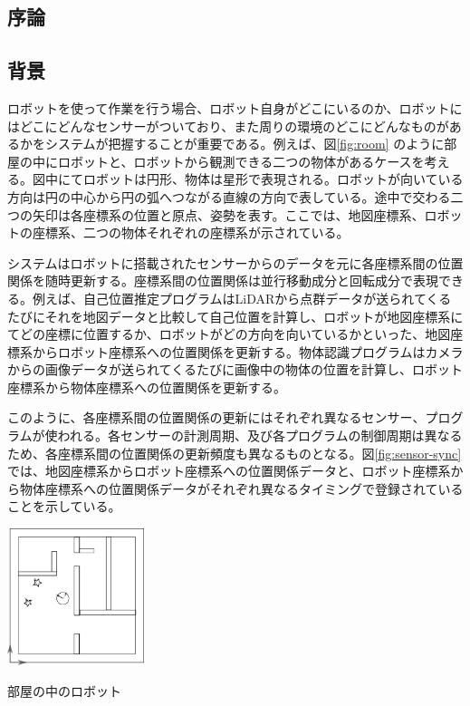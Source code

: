 \documentclass{jarticle}
\begin{document}
\begin{multicols}{2}

\section{序論}
\subsection{背景}
ロボットを使って作業を行う場合、ロボット自身がどこにいるのか、ロボットにはどこにどんなセンサーがついており、また周りの環境のどこにどんなものがあるかをシステムが把握することが重要である。例えば、図\ref{fig:room} のように部屋の中にロボットと、ロボットから観測できる二つの物体があるケースを考える。図中にてロボットは円形、物体は星形で表現される。ロボットが向いている方向は円の中心から円の弧へつながる直線の方向で表している。途中で交わる二つの矢印は各座標系の位置と原点、姿勢を表す。ここでは、地図座標系、ロボットの座標系、二つの物体それぞれの座標系が示されている。

システムはロボットに搭載されたセンサーからのデータを元に各座標系間の位置関係を随時更新する。座標系間の位置関係は並行移動成分と回転成分で表現できる。例えば、自己位置推定プログラムはLiDARから点群データが送られてくるたびにそれを地図データと比較して自己位置を計算し、ロボットが地図座標系にてどの座標に位置するか、ロボットがどの方向を向いているかといった、地図座標系からロボット座標系への位置関係を更新する。物体認識プログラムはカメラからの画像データが送られてくるたびに画像中の物体の位置を計算し、ロボット座標系から物体座標系への位置関係を更新する。

このように、各座標系間の位置関係の更新にはそれぞれ異なるセンサー、プログラムが使われる。各センサーの計測周期、及び各プログラムの制御周期は異なるため、各座標系間の位置関係の更新頻度も異なるものとなる。図\ref{fig:sensor-sync}では、地図座標系からロボット座標系への位置関係データと、ロボット座標系から物体座標系への位置関係データがそれぞれ異なるタイミングで登録されていることを示している。


\begin{figurehere} 
\centering
\includegraphics[width=0.3\textwidth]{room}	
\caption{部屋の中のロボット}
\label{fig:room}
\end{figurehere}



\end{multicols}
\end{document}
